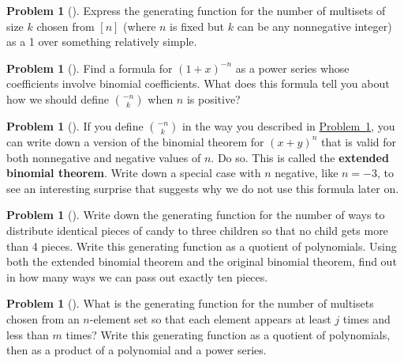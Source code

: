 \documentclass[10pt,]{book}
\newcommand{\terminology}[1]{\textbf{#1}}
\theoremstyle{plain}
\theoremstyle{definition}
\newtheorem{activity}[project]{Problem}
\theoremstyle{definition}
\numberwithin{equation}{chapter}
\begin{document}
\begin{activity}[]\marginsymbol[-1em]{} \label{multisetgenfn}
Express the generating function for the number of multisets of size \(k\) chosen from \([n]\) (where \(n\) is fixed but \(k\) can be any nonnegative integer) as a 1 over something relatively simple.%
\end{activity}
\begin{activity}[] \label{negnchoosek}
Find a formula for \((1+x)^{-n}\) as a power series whose coefficients involve binomial coefficients. What does this formula tell you about how we should define \(\binom{-n}{k}\) when \(n\) is positive?%
\end{activity}
\begin{activity}[]\marginsymbol[-1em]{} \label{activity-196}
If you define \(\binom{-n}{k}\) in the way you described in \hyperref[negnchoosek]{Problem~\ref{negnchoosek}}, you can write down a version of the binomial theorem for \((x+y)^n\) that is valid for both nonnegative and negative values of \(n\). Do so. This is called the \terminology{extended binomial theorem}. Write down a special case with \(n\) negative, like \(n=-3\), to see an interesting surprise that suggests why we do not use this formula later on.%
\end{activity}
\begin{activity}[]\marginsymbol[-1em]{} \label{candygenfn}
Write down the generating function for the number of ways to distribute identical pieces of candy to three children so that no child gets more than 4 pieces. Write this generating function as a quotient of polynomials. Using both the extended binomial theorem and the original binomial theorem, find out in how many ways we can pass out exactly ten pieces.%
\end{activity}
\begin{activity}[] \label{activity-198}
What is the generating function for the number of multisets chosen from an \(n\)-element set so that each element appears at least \(j\) times and less than \(m\) times? Write this generating function as a quotient of polynomials, then as a product of a polynomial and a power series.%
\end{activity}
\end{document}
